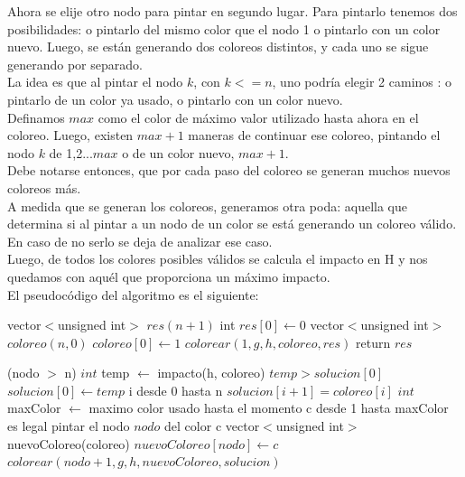 \indent Ahora se elije otro nodo para pintar en segundo lugar. Para pintarlo tenemos dos posibilidades: o pintarlo del mismo color que el nodo 1 o pintarlo con un color nuevo. Luego, se están generando dos coloreos distintos, y cada uno se sigue generando por separado.\\
\indent La idea es que al pintar el nodo $k$, con $k<=n$, uno podría elegir 2 caminos : o pintarlo de un color ya usado, o pintarlo con un color nuevo.\\
\indent Definamos $max$ como el color de máximo valor utilizado hasta ahora en el coloreo. Luego, existen $max+1$ maneras de continuar ese coloreo, pintando el nodo $k$ de 1,2...$max$ o de un color nuevo, $max+1$.\\
\indent Debe notarse entonces, que por cada paso del coloreo se generan muchos nuevos coloreos más.\\
\indent A medida que se generan los coloreos, generamos otra poda: aquella que determina si al pintar a un nodo de un color se está generando un coloreo válido. En caso de no serlo se deja de analizar ese caso.\\
\indent Luego, de todos los colores posibles válidos se calcula el impacto en H y nos quedamos con aquél que proporciona un máximo impacto.\\

\indent El pseudocódigo del algoritmo es el siguiente:\\   





\begin{algorithm}[H]
\caption{} 
\begin{codebox}

\li vector$<$unsigned int$>$ $res(n+1)$
\li int $res[0] \gets 0$
\li vector$<$unsigned int$>$ $coloreo(n,0)$
\li $coloreo[0] \gets 1$
\li $colorear(1,g,h,coloreo,res)$
\li	return $res$
\End
\end{codebox}
\end{algorithm}


\begin{algorithm}[H]
\caption{} 
\begin{codebox}

\li \If (nodo $>$ n) \Do
\li 	$int$ temp $\gets$ impacto(h, coloreo)
\li		\If $temp > solucion[0]$ \Do
\li			$solucion[0] \gets temp$
\li			\For i desde 0 hasta n \Do
\li				$solucion[i+1]=coloreo[i]$
			\End
		\End
	\End
\li \Else \Do
\li		$int$ maxColor $\gets $ maximo color usado hasta el momento 	
\li		\For c desde 1 hasta maxColor \Do
\li			\If es legal pintar el nodo $nodo$ del color c \Do
\li				vector$<$unsigned int$>$ nuevoColoreo(coloreo)
\li             $nuevoColoreo[nodo] \gets c$
\li             $colorear(nodo+1,g,h,nuevoColoreo,solucion)$
             \End
         \End
\End
\end{codebox}
\end{algorithm}


